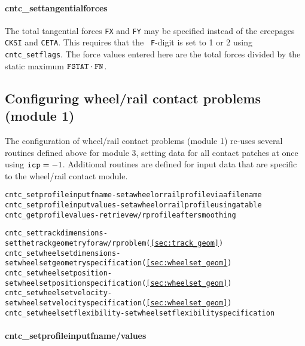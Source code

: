 \documentclass[12pt]{report}
\begin{document}
\paragraph{cntc\_settangentialforces}

The total tangential forces {\tt FX} and {\tt FY} may be specified instead
of the creepages {\tt CKSI} and {\tt CETA}. This requires that the {\tt
F}-digit is set to 1 or 2 using {\tt cntc\_set\-flags}. The force values
entered here are the total forces divided by the static maximum
${\tt FSTAT}\cdot{\tt FN}$.

\subsection{Configuring wheel/rail contact problems (module 1)}

The configuration of wheel/rail contact problems (module 1) re-uses several
routines defined above for module 3, setting data for all contact patches
at once using ${\tt icp}=-1$. Additional routines are defined for input
data that are specific to the wheel/rail contact module.
\begin{alltt}\small
cntc_setprofileinputfname   - set a wheel or rail profile via a filename
cntc_setprofileinputvalues  - set a wheel or rail profile using a table
cntc_getprofilevalues       - retrieve w/r profile after smoothing

cntc_settrackdimensions     - set the track geometry for a w/r problem (\ref{sec:track_geom})
cntc_setwheelsetdimensions  - set wheelset geometry specification (\ref{sec:wheelset_geom})
cntc_setwheelsetposition    - set wheelset position specification (\ref{sec:wheelset_geom})
cntc_setwheelsetvelocity    - set wheelset velocity specification (\ref{sec:wheelset_geom})
cntc_setwheelsetflexibility - set wheelset flexibility specification
\end{alltt}

\paragraph{cntc\_setprofileinputfname/values}
\end{document}
